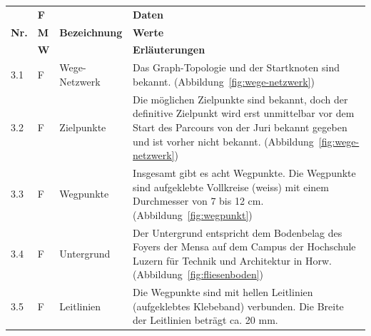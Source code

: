 \documentclass[../main.tex]{subfiles}
\begin{document}
\begin{tabular}{|l|p{0.5cm}|p{4cm}|p{10cm}|}
  \hline
               & \textbf{F} &                               & \textbf{Daten}                                                                                                                                                                                                       \\
  \textbf{Nr.} & \textbf{M} & \textbf{Bezeichnung}          & \textbf{Werte}                                                                                                                                                                                                       \\
               & \textbf{W} &                               & \textbf{Erläuterungen}                                                                                                                                                                                               \\
  \hline
  3.1          & F          & Wege-Netzwerk                 & Das Graph-Topologie und der Startknoten sind bekannt. (Abbildung~\ref{fig:wege-netzwerk})                                                                                                                            \\
  \hline
  3.2          & F          & Zielpunkte                    & Die möglichen Zielpunkte sind bekannt, doch der definitive Zielpunkt wird erst unmittelbar vor dem Start des Parcours von der Juri bekannt gegeben und ist vorher nicht bekannt. (Abbildung~\ref{fig:wege-netzwerk}) \\
  \hline
  3.3          & F          & Wegpunkte                     & Insgesamt gibt es acht Wegpunkte. Die Wegpunkte sind aufgeklebte Vollkreise (weiss) mit einem Durchmesser von 7 bis 12 cm. (Abbildung~\ref{fig:wegpunkt})                                                            \\
  \hline
  3.4          & F          & Untergrund                    & Der Untergrund entspricht dem Bodenbelag des Foyers der Mensa auf dem Campus der Hochschule Luzern für Technik und Architektur in Horw. (Abbildung~\ref{fig:fliesenboden})                                           \\
  \hline
  3.5          & F          & Leitlinien                    & Die Wegpunkte sind mit hellen Leitlinien (aufgeklebtes Klebeband) verbunden. Die Breite der Leitlinien beträgt ca. 20 mm.                                                                                            \\

\end{tabular}
\end{document}
